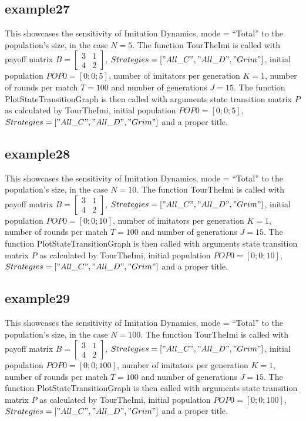 \subsection{example27}
This showcases the sensitivity of Imitation Dynamics, mode = ``Total'' to the population's size, in the case $N=5$. The function TourTheImi is called with payoff matrix $B = \begin{bmatrix} 3 & 1 \\ 4 & 2 \end{bmatrix}$, $Strategies = ["All\_C", "All\_D", "Grim"]$, initial population $POP0 = [0; 0; 5]$, number of imitators per generation $K=1$, number of rounds per match $T = 100$ and number of generations $J = 15$. The function PlotStateTransitionGraph is then called with arguments state transition matrix $P$ as calculated by TourTheImi, initial population $POP0 = [0; 0; 5]$, $Strategies = ["All\_C", "All\_D", "Grim"]$ and a proper title.

\subsection{example28}
This showcases the sensitivity of Imitation Dynamics, mode = ``Total'' to the population's size, in the case $N=10$. The function TourTheImi is called with payoff matrix $B = \begin{bmatrix} 3 & 1 \\ 4 & 2 \end{bmatrix}$, $Strategies = ["All\_C", "All\_D", "Grim"]$, initial population $POP0 = [0; 0; 10]$, number of imitators per generation $K=1$, number of rounds per match $T = 100$ and number of generations $J = 15$. The function PlotStateTransitionGraph is then called with arguments state transition matrix $P$ as calculated by TourTheImi, initial population $POP0 = [0; 0; 10]$, $Strategies = ["All\_C", "All\_D", "Grim"]$ and a proper title.

\subsection{example29}
This showcases the sensitivity of Imitation Dynamics, mode = ``Total'' to the population's size, in the case $N=100$. The function TourTheImi is called with payoff matrix $B = \begin{bmatrix} 3 & 1 \\ 4 & 2 \end{bmatrix}$, $Strategies = ["All\_C", "All\_D", "Grim"]$, initial population $POP0 = [0; 0; 100]$, number of imitators per generation $K=1$, number of rounds per match $T = 100$ and number of generations $J = 15$. The function PlotStateTransitionGraph is then called with arguments state transition matrix $P$ as calculated by TourTheImi, initial population $POP0 = [0; 0; 100]$, $Strategies = ["All\_C", "All\_D", "Grim"]$ and a proper title.

